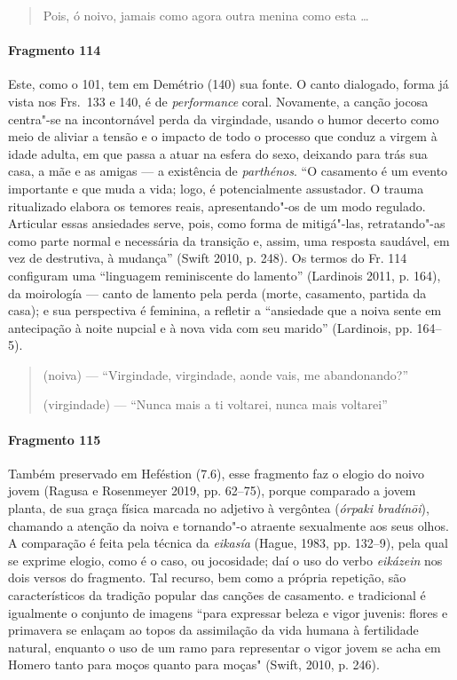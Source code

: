 {\begin{verse}
Pois, ó noivo, jamais como agora outra menina \qb{}como esta \ldots{}
\end{verse}

\paragraph{Fragmento 114}

{\small Este, como o 101, tem em Demétrio (140) sua fonte. O canto dialogado, forma já vista
nos Frs.~133 e 140, é de \textit{performance} coral. Novamente, a canção jocosa
centra"-se na incontornável perda da virgindade, usando o humor decerto como
meio de aliviar a tensão e o impacto de todo o processo que conduz a virgem à
idade adulta, em que passa a atuar na esfera do sexo, deixando para trás sua casa, a mãe e as amigas --- a existência de \textit{parthénos}.
“O casamento é um evento importante e que muda a vida; logo, é potencialmente assustador. O trauma ritualizado elabora os temores reais, apresentando"-os de um modo regulado. Articular essas ansiedades serve, pois, como forma de mitigá"-las, retratando"-as como parte normal e necessária da transição e, assim, uma resposta saudável, em vez de destrutiva, à mudança” (Swift 2010, p. 248).
Os termos do Fr. 114 configuram uma “linguagem reminiscente do lamento” (Lardinois 2011, p. 164), da moirología --- canto de lamento pela perda (morte, casamento, partida da casa); e sua perspectiva é feminina, a refletir a “ansiedade que a noiva sente em antecipação à noite nupcial e à nova vida com seu marido” (Lardinois, pp. 164--5).}

\begin{verse}
(noiva) --- ``Virgindade, virgindade, aonde vais, me \qb{}abandonando?''

(virgindade) --- ``Nunca mais a ti voltarei, nunca \qb{}mais voltarei''
\end{verse}

\paragraph{Fragmento 115}

{\small Também preservado em Heféstion (7.6), esse fragmento faz o elogio do noivo jovem (Ragusa e Rosenmeyer 2019, pp. 62--75), porque comparado a jovem planta, de sua
graça física marcada no adjetivo à vergôntea (\textit{órpaki bradínōi}), chamando a atenção da noiva e tornando"-o atraente sexualmente aos seus olhos.
A comparação é feita pela técnica da \textit{eikasía} (Hague, 1983, pp. 132--9), pela qual se exprime elogio, como é o caso, ou jocosidade; daí o uso do verbo \textit{eikázein} nos dois versos do fragmento. Tal recurso, bem como a própria repetição, são característicos da tradição popular das canções de casamento. e tradicional é igualmente o conjunto de imagens “para expressar beleza e vigor juvenis: flores e primavera se enlaçam ao topos da assimilação da vida humana à fertilidade natural, enquanto o uso de um ramo para representar o vigor jovem se acha em Homero tanto para moços quanto para moças" (Swift, 2010, p. 246). }

}
